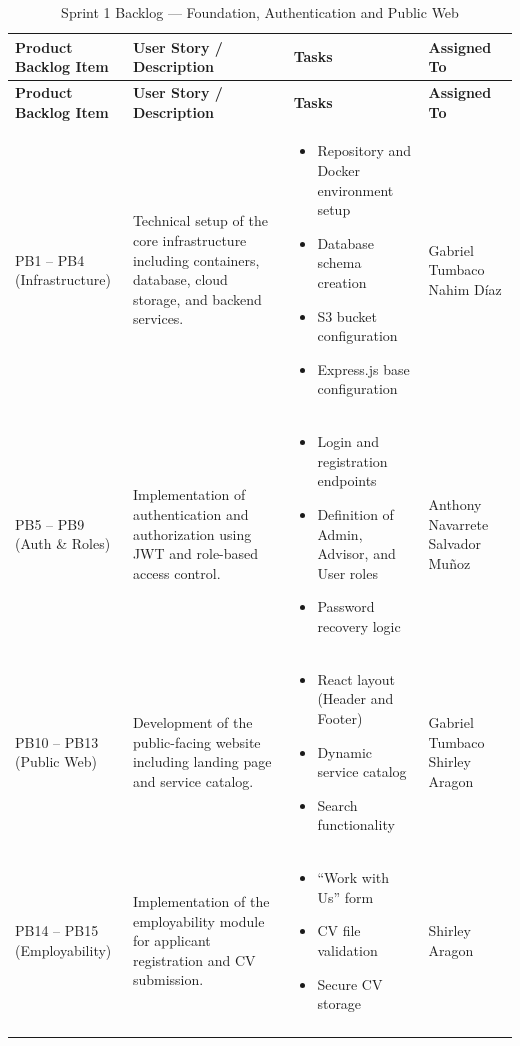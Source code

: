 \documentclass[letterpaper%
, oneside%
, 12pt%
, memoireprojet%
, english%
,creativecommons,hyperref, withAlgo2e %
]{thETS}
\begin{document}
\begin{longtable}{|
p{3.0cm}|
p{4.6cm}|
p{5.6cm}|
p{3.0cm}|
}
\hline
\textbf{Product Backlog Item} &
\textbf{User Story / Description} &
\textbf{Tasks} &
\textbf{Assigned To} \\ \hline
\endfirsthead

\hline
\textbf{Product Backlog Item} &
\textbf{User Story / Description} &
\textbf{Tasks} &
\textbf{Assigned To} \\ \hline
\endhead

PB1 -- PB4 (Infrastructure) &
Technical setup of the core infrastructure including containers, database, cloud storage, and backend services. &
\begin{itemize}\setlength{\itemsep}{2pt}
\item Repository and Docker environment setup
\item Database schema creation
\item S3 bucket configuration
\item Express.js base configuration
\end{itemize} &
Gabriel Tumbaco \newline
Nahim Díaz \\ \hline

PB5 -- PB9 (Auth \& Roles) &
Implementation of authentication and authorization using JWT and role-based access control. &
\begin{itemize}\setlength{\itemsep}{2pt}
\item Login and registration endpoints
\item Definition of Admin, Advisor, and User roles
\item Password recovery logic
\end{itemize} &
Anthony Navarrete \newline
Salvador Muñoz \\ \hline

PB10 -- PB13 (Public Web) &
Development of the public-facing website including landing page and service catalog. &
\begin{itemize}\setlength{\itemsep}{2pt}
\item React layout (Header and Footer)
\item Dynamic service catalog
\item Search functionality
\end{itemize} &
Gabriel Tumbaco \newline
Shirley Aragon \\ \hline

PB14 -- PB15 (Employability) &
Implementation of the employability module for applicant registration and CV submission. &
\begin{itemize}\setlength{\itemsep}{2pt}
\item ``Work with Us'' form
\item CV file validation
\item Secure CV storage
\end{itemize} &
Shirley Aragon \\ \hline

\caption{Sprint 1 Backlog — Foundation, Authentication and Public Web}
\end{longtable}
\end{document}

